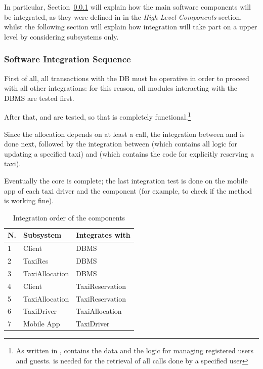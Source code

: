\documentclass[a4paper, 12pt]{article}
\begin{document}
In particular, Section~\ref{ssub:software_integration_sequence} will explain how the main software components will be integrated, as they were defined in \cite{bib:dd} in the \emph{High Level Components} section, whilst the following section will explain how integration will take part on a upper level by considering subsystems only.

\subsubsection{Software Integration Sequence}
\label{ssub:software_integration_sequence}


First of all, all transactions with the DB must be operative in order to proceed with all other integrations: for this reason, all modules interacting with the DBMS are tested first.

After that,  and  are tested, so that  is completely functional.\footnote{As written in \cite{bib:dd},  contains the data and the logic for managing registered users and guests.  is needed for the retrieval of all calls done by a specified user}

Since the allocation depends on at least a call, the integration between  and  is done next, followed by the integration between  (which contains all logic for updating a specified taxi) and  (which contains the code for explicitly reserving a taxi).

Eventually the core is complete; the last integration test is done on the mobile app of each taxi driver and the  component (for example, to check if the  method is working fine).

\begin{table}
    \centering
    \begin{tabular}{| l | l | l |}
        \hline
        \textbf{N.} & \textbf{Subsystem} & \textbf{Integrates with} \\
        \hline
        1 & Client & DBMS \\
        2 & TaxiRes & DBMS \\
        3 & TaxiAllocation & DBMS \\
        4 & Client & TaxiReservation \\
        5 & TaxiAllocation & TaxiReservation \\
        6 & TaxiDriver & TaxiAllocation \\
        7 & Mobile App & TaxiDriver \\
        \hline
    \end{tabular}
    \caption{Integration order of the components}
    \label{tab:component-integration}
\end{table}
\end{document}
